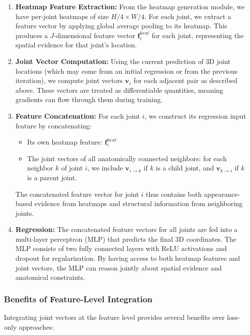 \begin{enumerate}
    \item[(a)] \textbf{Heatmap Feature Extraction:} From the heatmap generation module, we have per-joint heatmaps of size \(H/4 \times W/4\). For each joint, we extract a feature vector by applying global average pooling to its heatmap. This produces a \(J\)-dimensional feature vector \(\mathbf{f}_i^{heat}\) for each joint, representing the spatial evidence for that joint's location.

    \item[(b)] \textbf{Joint Vector Computation:} Using the current prediction of 3D joint locations (which may come from an initial regression or from the previous iteration), we compute joint vectors \(\mathbf{v}_i\) for each adjacent pair as described above. These vectors are treated as differentiable quantities, meaning gradients can flow through them during training.

    \item[(c)] \textbf{Feature Concatenation:} For each joint \(i\), we construct its regression input feature by concatenating:
    \begin{itemize}
        \item Its own heatmap feature: \(\mathbf{f}_i^{heat}\)
        \item The joint vectors of all anatomically connected neighbors: for each neighbor \(k\) of joint \(i\), we include \(\mathbf{v}_{i \rightarrow k}\) if \(k\) is a child joint, and \(\mathbf{v}_{k \rightarrow i}\) if \(k\) is a parent joint.
    \end{itemize}
    The concatenated feature vector for joint \(i\) thus contains both appearance-based evidence from heatmaps and structural information from neighboring joints.

    \item[(d)] \textbf{Regression:} The concatenated feature vectors for all joints are fed into a multi-layer perceptron (MLP) that predicts the final 3D coordinates. The MLP consists of two fully connected layers with ReLU activations and dropout for regularization. By having access to both heatmap features and joint vectors, the MLP can reason jointly about spatial evidence and anatomical constraints.
\end{enumerate}

\subsubsection{Benefits of Feature-Level Integration}
Integrating joint vectors at the feature level provides several benefits over loss-only approaches:

